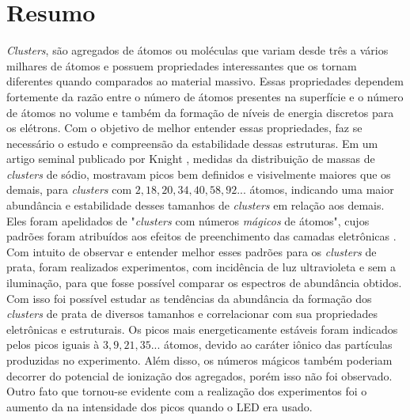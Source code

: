 \chapter*{Resumo}

\textit{Clusters}, são agregados de átomos ou moléculas que variam desde três a vários milhares de átomos e possuem propriedades interessantes que os tornam diferentes quando comparados ao material massivo. Essas propriedades dependem fortemente da razão entre o número de átomos presentes na superfície e o número de átomos no volume e também da formação de níveis de energia discretos para os elétrons.  
Com o objetivo de melhor entender essas propriedades, faz se necessário o estudo e compreensão da estabilidade dessas estruturas. Em um artigo seminal publicado por Knight \cite{electronic_Shell_sodium}, medidas da distribuição de massas de \textit{clusters} de sódio, mostravam picos bem definidos e visivelmente maiores que os demais, para \textit{clusters} com $2, 18, 20, 34, 40, 58,92 ...$ átomos, indicando uma maior abundância e estabilidade desses tamanhos de \textit{clusters} em relação aos demais. Eles foram apelidados de "\textit{clusters} com números
\textit{mágicos} de átomos", cujos padrões foram atribuídos aos efeitos de preenchimento das camadas eletrônicas \cite{Brack}. Com intuito de observar e entender melhor esses padrões para os \textit{clusters} de prata, foram realizados experimentos, com incidência de luz ultravioleta e sem a iluminação, para que fosse possível comparar os espectros  de abundância obtidos. Com isso foi possível estudar as tendências da abundância da formação dos \textit{clusters} de prata de diversos tamanhos e correlacionar com sua propriedades eletrônicas e estruturais. Os picos mais energeticamente estáveis foram indicados pelos picos iguais à $ 3,9,21,35...$ átomos, devido ao caráter iônico das partículas produzidas no experimento. Além disso, os números mágicos também poderiam decorrer do potencial de ionização dos agregados, porém isso não foi observado. Outro fato que tornou-se evidente com a realização dos experimentos foi o aumento da na intensidade dos picos quando o LED era usado.

